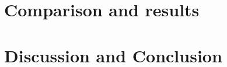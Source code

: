\documentclass[a4paper,11 pt]{report}
\begin{document}






\chapter{Comparison and results} 	%
\label{chapterComparisonAndResults}



\chapter{Discussion and Conclusion}




\end{document}
